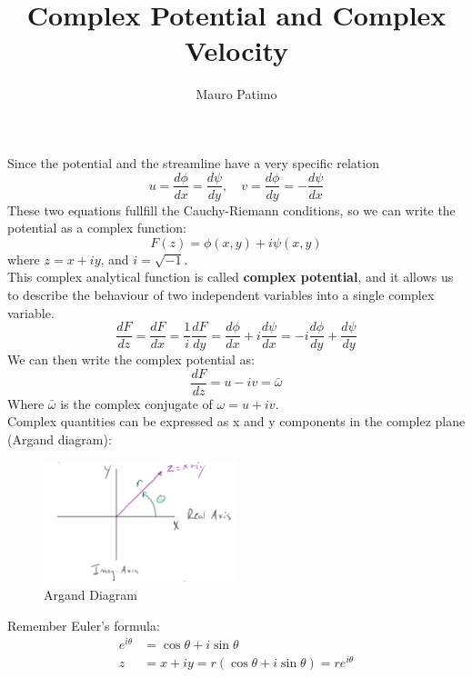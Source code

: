 \documentclass{article}
\title{Complex Potential and Complex Velocity}
\author{Mauro Patimo}
\begin{document}
\maketitle

Since the potential and the streamline have a very specific relation
\begin{equation}
    u=\frac{d\phi}{dx}=\frac{d\psi}{dy}, \quad v=\frac{d\phi}{dy}=-\frac{d\psi}{dx}
\end{equation}
These two equations fullfill the Cauchy-Riemann conditions, so we can write the potential as a complex function:
\begin{equation}
    F(z)=\phi(x,y)+i\psi(x,y)
\end{equation}
where $z=x+iy$, and $i=\sqrt{-1}$.\\
This complex analytical function is called \textbf{complex potential}, and it allows us to describe the behaviour of two independent variables into a single complex variable.\\
\begin{equation}
    \frac{dF}{dz}=\frac{dF}{dx}=\frac{1}{i}\frac{dF}{dy}=\frac{d\phi}{dx}+i\frac{d\psi}{dx}=-i\frac{d\phi}{dy}+\frac{d\psi}{dy}
\end{equation}
We can then write the complex potential as:
\begin{equation}
    \frac{dF}{dz}=u-iv=\bar{\omega}
\end{equation}
Where $\bar{\omega}$ is the complex conjugate of $\omega=u+iv$.\\
Complex quantities can be expressed as x and y components in the complez plane (Argand diagram):
\begin{figure}
    \centering
    \includegraphics[width=0.5\textwidth]{Argand Diagram.png}
    \caption{Argand Diagram}
    \label{fig:Argand Diagram}
\end{figure}
Remember Euler's formula:
\begin{align*}
    e^{i\theta}&=\cos\theta+i\sin\theta \\
    z &= x+iy = r(\cos\theta+i\sin\theta)=re^{i\theta}
\end{align*}
\end{document}
